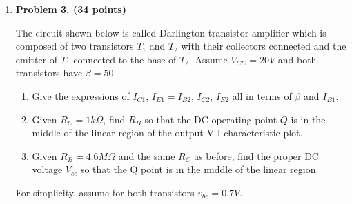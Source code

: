 \begin{enumerate}


\item {\bf Problem 3. (34 points)} 



The circuit shown below is called Darlington transistor amplifier which is
composed of two transistors $T_1$ and $T_2$ with their collectors connected 
and the emitter of $T_1$ connected to the base of $T_2$. Assume $V_{CC}=20V$ 
and both transistors have $\beta=50$. 
\begin{enumerate}
\item Give the expressions of $I_{C1}$, $I_{E1}=I_{B2}$, $I_{C2}$, $I_{E2}$
  all in terms of $\beta$ and $I_{B1}$.
\item Given $R_C=1 k\Omega$, find $R_B$ so that the DC operating point $Q$
  is in the middle of the linear region of the output V-I characteristic plot.
\item Given $R_B= 4.6 M\Omega$ and the same $R_C$ as before, find the proper 
DC voltage $V_{cc}$ so that the Q point is in the middle of the linear region.
\end{enumerate}
For simplicity, assume for both transistors $v_{be}=0.7V$.


\end{enumerate}
